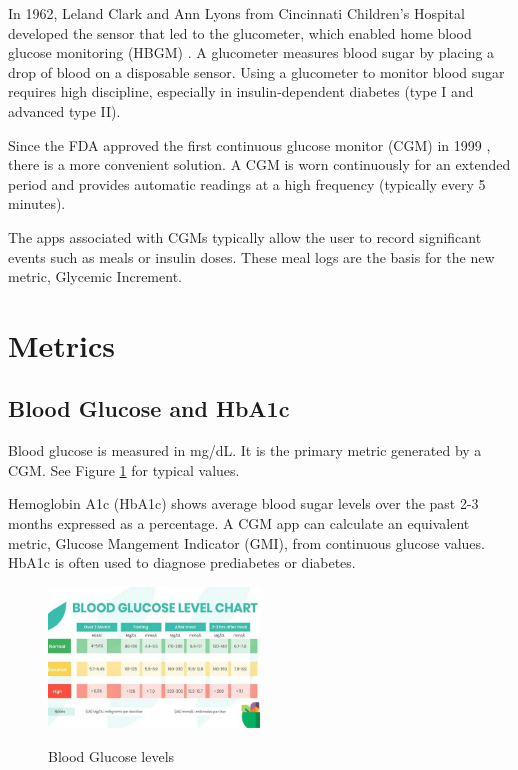 \documentclass[conference]{IEEEtran}
\begin{document}
In 1962, Leland Clark and Ann Lyons from Cincinnati Children's Hospital developed the sensor that led to the glucometer, which enabled home blood glucose monitoring (HBGM) \cite{Clark_1962}. A glucometer measures blood sugar by placing a drop of blood on a disposable sensor. Using a glucometer to monitor blood sugar requires high discipline, especially in insulin-dependent diabetes (type I and advanced type II).

Since the FDA approved the first continuous glucose monitor (CGM) in 1999 \cite{Reddy_2023}, there is a more convenient solution. A CGM is worn continuously for an extended period and provides automatic readings at a high frequency (typically every 5 minutes).

The apps associated with CGMs typically allow the user to record significant events such as meals or insulin doses. These meal logs are the basis for the new metric, Glycemic Increment.

\section{Metrics}

\subsection{Blood Glucose and HbA1c}

Blood glucose is measured in mg/dL. It is the primary metric generated by a CGM. See Figure \ref{fig:glucose_chart} for typical values.

Hemoglobin A1c (HbA1c) shows average blood sugar levels over the past 2-3 months expressed as a percentage. A CGM app can calculate an equivalent metric, Glucose Mangement Indicator (GMI), from continuous glucose values. HbA1c is often used to diagnose prediabetes or diabetes.

\begin{figure}[tbp]
    \includegraphics[width=0.5\textwidth]{images/Normal-Blood-Sugar-Levels-Chart.jpg}
    \label{fig:glucose_chart}
    \caption{Blood Glucose levels \protect\cite{Agarwal_2025}}
\end{figure}
\end{document}
